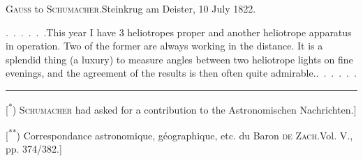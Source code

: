 \par\bigskip
\begin{center}{\large\textsc{Gauss} to \textsc{Schumacher}.\quad Steinkrug am Deister, 10 July 1822.}\end{center}
\par\noindent\hspace*{\parindent}.\ .\ .\ .\ .\ .\enspace This year I have 3 heliotropes proper and another heliotrope apparatus in operation. Two of the former are always working in the distance. It is a splendid thing (a luxury) to measure angles between two heliotrope lights on fine evenings, and the agreement of the results is then often quite admirable.\enspace .\ .\ .\ .\ .\ .
\par\medskip\noindent\rule{4cm}{.4pt}\par
\begingroup\footnotesize
\noindent\hspace*{\parindent}[\textsuperscript{*}) \textsc{Schumacher} had asked for a contribution to the Astronomischen Nachrichten.]\par
\noindent\hspace*{\parindent}[\textsuperscript{**}) Correspondance astronomique, géographique, etc. du Baron \textsc{de Zach}.\quad Vol. V., pp. 374/382.]\par
\endgroup

